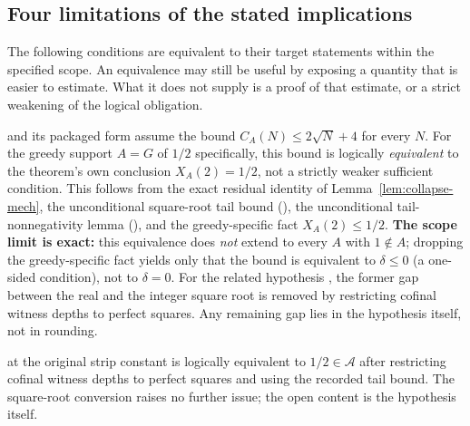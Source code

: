 \subsection{Four limitations of the stated implications}

The following conditions are equivalent to their target statements
within the specified scope.  An equivalence may still be useful by
exposing a quantity that is easier to estimate.  What it does not
supply is a proof of that estimate, or a strict weakening of the
logical obligation.

\begin{rem}
and its packaged form
assume the bound $C_A(N)\le2\sqrt N+4$ for every $N$. For the greedy support $A=G$ of $1/2$
specifically, this bound is logically \emph{equivalent} to the theorem's own conclusion
$X_{A}(2)=1/2$, not a strictly weaker sufficient condition. This follows
from the exact residual identity of Lemma~\ref{lem:collapse-mech}, the unconditional
square-root tail bound
(), the
unconditional tail-nonnegativity lemma
(), and the greedy-specific fact
$X_{A}(2)\le1/2$. \textbf{The scope limit is exact:} this equivalence does \emph{not} extend to
every $A$ with $1\notin A$; dropping the greedy-specific fact yields only that the bound is
equivalent to $\delta\le0$ (a one-sided condition), not to $\delta=0$. For the related hypothesis
, the former gap between
the real and the integer square root is removed by restricting cofinal witness depths
to perfect squares. Any remaining gap lies in the hypothesis itself, not in rounding.
\end{rem}

\begin{rem}
 at the original strip
constant is logically equivalent to $1/2\in\ensuremath{\mathcal A}$ after restricting
cofinal witness depths to perfect squares and using the recorded tail bound. The square-root
conversion raises no further issue; the open content is the hypothesis itself.
\end{rem}

